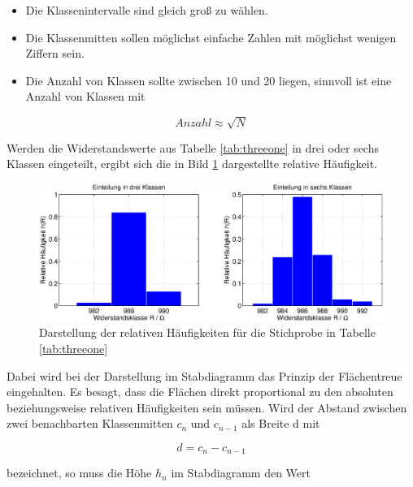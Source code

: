 \begin{itemize}
    \item  Die Klassenintervalle sind gleich gro{\ss} zu w\"{a}hlen.
    \item  Die Klassenmitten sollen m\"{o}glichst einfache Zahlen mit m\"{o}glichst wenigen Ziffern sein.
    \item  Die Anzahl von Klassen sollte zwischen 10 und 20 liegen, sinnvoll ist eine Anzahl von Klassen mit 
\end{itemize}

\begin{equation}\label{eq:threefive}
Anzahl\approx \sqrt{N}
\end{equation}

\noindent Werden die Widerstandswerte aus Tabelle \ref{tab:threeone} in drei oder sechs Klassen eingeteilt, ergibt sich die in Bild \ref{fig:HaeufigkeitStichprobeWiderstandKlassen} dargestellte relative H\"{a}ufigkeit.

\noindent 
\begin{figure}[H]
  \centerline{\includegraphics[width=1\textwidth]{Kapitel3/Bilder/image3}}
  \caption{Darstellung der relativen H\"{a}ufigkeiten f\"{u}r die Stichprobe in Tabelle \ref{tab:threeone}}
  \label{fig:HaeufigkeitStichprobeWiderstandKlassen}
\end{figure}

\noindent Dabei wird bei der Darstellung im Stabdiagramm das Prinzip der Fl\"{a}chentreue eingehalten. Es besagt, dass die Fl\"{a}chen direkt proportional zu den absoluten beziehungsweise relativen H\"{a}ufigkeiten sein m\"{u}ssen. Wird der Abstand zwischen zwei benachbarten Klassenmitten $c_{n}$ und $c_{n-1}$ als Breite d mit 

\begin{equation}\label{eq:threesix}
d=c_{n} -c_{n-1}
\end{equation}

\noindent bezeichnet, so muss die H\"{o}he $h_{n}$ im Stabdiagramm den Wert 

